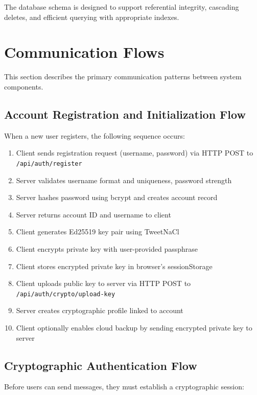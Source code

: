\documentclass[12pt,a4paper,openany]{book}
\begin{document}
The database schema is designed to support referential integrity, cascading deletes, and efficient querying with appropriate indexes.

\section{Communication Flows}

This section describes the primary communication patterns between system components.

\subsection{Account Registration and Initialization Flow}

When a new user registers, the following sequence occurs:

\begin{enumerate}
\item Client sends registration request (username, password) via HTTP POST to \texttt{/api/auth/}\allowbreak\texttt{register}
\item Server validates username format and uniqueness, password strength
\item Server hashes password using bcrypt and creates account record
\item Server returns account ID and username to client
\item Client generates Ed25519 key pair using TweetNaCl
\item Client encrypts private key with user-provided passphrase
\item Client stores encrypted private key in browser's sessionStorage
\item Client uploads public key to server via HTTP POST to \texttt{/api/auth/crypto/}\allowbreak\texttt{upload-key}
\item Server creates cryptographic profile linked to account
\item Client optionally enables cloud backup by sending encrypted private key to server
\end{enumerate}

\subsection{Cryptographic Authentication Flow}

Before users can send messages, they must establish a cryptographic session:
\end{document}
